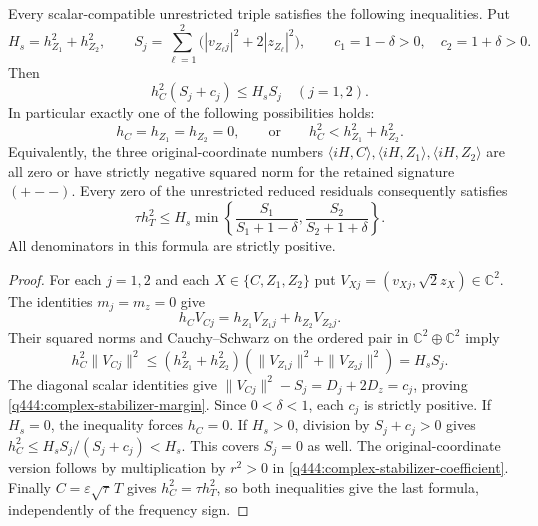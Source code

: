 \begin{theorem}
\label{q444:complex-stabilizer-spacelike}
Every scalar-compatible unrestricted triple satisfies the following
inequalities. Put
\[
H_s=h_{Z_1}^2+h_{Z_2}^2,\qquad
S_j=\sum_{\ell=1}^2\bigl(|v_{Z_\ell j}|^2+2|z_{Z_\ell}|^2\bigr),
\qquad c_1=1-\delta>0,\quad c_2=1+\delta>0.
\]
Then
\begin{equation}
h_C^2(S_j+c_j)\le H_s S_j\quad(j=1,2).
\label{q444:complex-stabilizer-margin}
\end{equation}
In particular exactly one of the following possibilities holds:
\[
h_C=h_{Z_1}=h_{Z_2}=0,\qquad\text{or}\qquad
h_C^2<h_{Z_1}^2+h_{Z_2}^2.
\]
Equivalently, the three original-coordinate numbers
$\langle iH,C\rangle,\langle iH,Z_1\rangle,\langle iH,Z_2\rangle$
are all zero or have strictly negative squared norm for the retained
signature $(+--)$.
Every zero of the unrestricted reduced residuals consequently satisfies
\begin{equation}
\tau h_T^2\le H_s
\min\left\{\frac{S_1}{S_1+1-\delta},
\frac{S_2}{S_2+1+\delta}\right\}.
\label{q444:complex-reduced-stabilizer-filter}
\end{equation}
All denominators in this formula are strictly positive.
\end{theorem}
\begin{proof}
For each $j=1,2$ and each $X\in\{C,Z_1,Z_2\}$ put
$V_{Xj}=(v_{Xj},\sqrt2 z_X)\in\mathbb C^2$.
The identities $m_j=m_z=0$ give
\[
h_C V_{Cj}=h_{Z_1}V_{Z_1j}+h_{Z_2}V_{Z_2j}.
\]
Their squared norms and Cauchy--Schwarz on the ordered pair in
$\mathbb C^2\oplus\mathbb C^2$ imply
\[
h_C^2\|V_{Cj}\|^2
\le(h_{Z_1}^2+h_{Z_2}^2)
(\|V_{Z_1j}\|^2+\|V_{Z_2j}\|^2)=H_sS_j.
\]
The diagonal scalar identities give
$\|V_{Cj}\|^2-S_j=D_j+2D_z=c_j$, proving
\eqref{q444:complex-stabilizer-margin}.
Since $0<\delta<1$, each $c_j$ is strictly positive. If $H_s=0$,
the inequality forces $h_C=0$. If $H_s>0$, division by $S_j+c_j>0$
gives $h_C^2\le H_sS_j/(S_j+c_j)<H_s$.
This covers $S_j=0$ as well. The original-coordinate version follows
by multiplication by $r^2>0$ in
\eqref{q444:complex-stabilizer-coefficient}.
Finally $C=\varepsilon\sqrt\tau\,T$ gives $h_C^2=\tau h_T^2$,
so both inequalities give the last formula, independently of the
frequency sign.
\end{proof}

